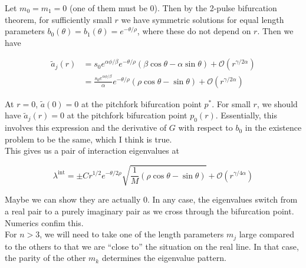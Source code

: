 \documentclass[thesis.tex]{subfiles}
\begin{document}
Let $m_0 = m_1 = 0$ (one of them must be 0). Then by the 2-pulse bifurcation theorem, for sufficiently small $r$ we have symmetric solutions for equal length parameters $b_0(\theta) = b_1(\theta) = e^{-\theta/\rho}$, where these do not depend on $r$. Then we have

\begin{align*}
\tilde{a}_j(r)
&= s_0 e^{\alpha \phi/\beta} e^{-\theta/\rho} \left( \beta \cos \theta - \alpha \sin \theta \right) + \mathcal{O}(r^{\gamma/2\alpha}) \\
&= \frac{s_0 e^{\alpha \phi/\beta} }{\alpha}  e^{-\theta/\rho} \left( \rho \cos \theta - \sin \theta \right) + \mathcal{O}(r^{\gamma/2\alpha})
\end{align*}

At $r = 0$, $\tilde{a}(0) = 0$ at the pitchfork bifurcation point $p^*$. For small $r$, we should have $\tilde{a}_j(r) = 0$ at the pitchfork bifurcation point $p_0(r)$. Essentially, this involves this expression and the derivative of $G$ with respect to $b_0$ in the existence problem to be the same, which I think is true.\\

This gives us a pair of interaction eigenvalues at

\[
\lambda^{\text{int}} = \pm C r^{1/2} e^{-\theta/2\rho} \sqrt{ \frac{1}{M} \left( \rho \cos \theta - \sin \theta \right) } + \mathcal{O}(r^{\gamma/4\alpha})
\]

Maybe we can show they are actually 0. In any case, the eigenvalues switch from a real pair to a purely imaginary pair as we cross through the bifurcation point. Numerics confim this.\\

For $n > 3$, we will need to take one of the length parameters $m_j$ large compared to the others to that we are ``close to'' the situation on the real line. In that case, the parity of the other $m_k$ determines the eigenvalue pattern.

\end{document}
